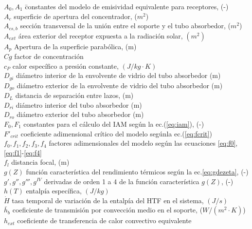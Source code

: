 \begin{tabbing}
$A_0, A_1$ \quad\quad\quad\quad\quad\= constantes del modelo de emisividad equivalente para receptores, (-) \\
$A_{c}$ \> superficie de apertura del concentrador, ($m^2$) \\
$A_{cs,b}$ \> sección transversal de la unión entre el soporte y el tubo absorbedor, ($m^2$) \\
$A_{ext}$ \>  área exterior del receptor expuesta a la radiación solar, $(m^2)$ \\
$A_{p}$ \> Apertura de la superficie parabólica, (m) \\
$Cg$  \>   factor de concentración \\
$c_P$ \> calor específico a presión constante, $(J/kg\cdot K)$ \\
$D_{gi}$  \>  diámetro interior de la envolvente de vidrio del tubo absorbedor (m) \\
$D_{go}$ \> diámetro exterior de la envolvente de vidrio del tubo absorbedor (m)   \\
$D_L$ \> distancia de separación entre lazos, (m) \\
$D_{ri}$  \>  diámetro interior del tubo absorbedor (m) \\
$D_{ro}$ \> diámetro exterior del tubo absorbedor (m)   \\
$F_0, F_1$ \> constantes para el cálculo del IAM según la ec.(\eqref{eq:iam}), (-) \\
$F'_{crit}$ \> coeficiente adimensional crítico del modelo segúnla ec.(\eqref{eq:fcrit}) \\
$f_0, f_1, f_2, f_3, f_4$ \> factores adimensionales del modelo según las ecuaciones \eqref{eq:f0}, \eqref{eq:f1}-\eqref{eq:f4} \\
$f_l$ \> distancia focal, (m) \\
$g(Z)$ \> función característica del rendimiento térmicos según la ec.\eqref{eq:gdezeta}, (-) \\
$g', g'', g''', g^{IV}$ \> derivadas de orden 1 a 4 de la función característica $g(Z)$, (-) \\
$h(T)$ \> entalpía específica, $(J/kg)$ \\
$\dot H$ \> tasa temporal de variación de la entalpía del HTF en el sistema, $(J/s)$ \\
$\bar h_b$ \>coeficiente de transmisión por convección medio en el soporte, ($W/(m^2 \cdot K)$) \\
$h_{ext}$ \> coeficiente de transferencia de calor convectivo equivalente \\

\end{tabbing}
